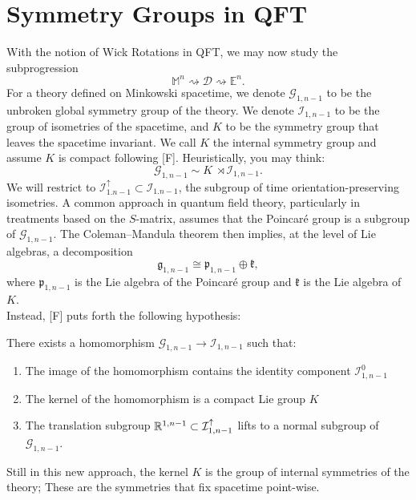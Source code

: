 \documentclass[a4paper,11pt]{article}
\begin{document}
\section{Symmetry Groups in QFT}
With the notion of Wick Rotations in QFT, we may now study the subprogression
\[
\mathbb{M}^n \rightsquigarrow \mathcal{D} \rightsquigarrow \mathbb{E}^n.
\]
For a theory defined on Minkowski spacetime, we denote $\mathcal{G}_{1,n-1}$ to be the unbroken global symmetry group of the theory. We denote $\mathcal{I}_{1,n-1}$ to be the group of isometries of the spacetime, and $K$ to be the symmetry group that leaves the spacetime invariant. We call $K$ the  internal symmetry group and assume $K$ is compact following [F]. Heuristically, you may think: 
\[
\mathcal{G}_{1,n-1} \sim K \; \rtimes \mathcal{I}_{1,n-1}.\]
We will restrict to $\mathcal{I}^\uparrow_{1.n-1} \subset \mathcal{I}_{1.n-1}$, the subgroup of time orientation-preserving isometries. A common approach in quantum field theory, particularly in treatments based on the $S$-matrix, assumes that the Poincar\'e group is a subgroup of $\mathcal{G}_{1,n-1}$. The Coleman--Mandula theorem then implies, at the level of Lie algebras, a decomposition
\[
    \mathfrak{g}_{1,n-1}
    \cong
    \mathfrak{p}_{1,n-1}\oplus\mathfrak{k},
\]
where $\mathfrak{p}_{1,n-1}$ is the Lie algebra of the Poincar\'e group and $\mathfrak{k}$ is the Lie algebra of $K$.\\

Instead, [F] puts forth the following hypothesis:

\begin{statement}
    There exists a homomorphism $\mathcal{G}_{1,n-1} \to \mathcal{I}_{1,n-1}$ such that:
    \begin{enumerate}
        \item The image of the homomorphism contains the identity component $\mathcal{I}^0_{1,n-1}$
        \item The kernel of the homomorphism is a compact Lie group $K$
        \item The translation subgroup $\mathbb{R}^{1,n-1} \subset \mathcal{I}^\uparrow_{1,n-1}$ lifts to a normal subgroup of $\mathcal{G}_{1,n-1}$.
    \end{enumerate}
\end{statement}
Still in this new approach, the kernel $K$ is the group of internal symmetries of the theory; These are the symmetries that fix spacetime point-wise.
\end{document}
